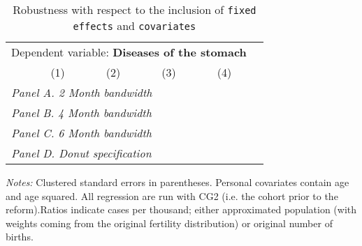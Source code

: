  \begin{table}[H] \begin{threeparttable} \centering \caption{Robustness with respect to the inclusion of \texttt{fixed effects} and \texttt{covariates}} {\def\sym#1{\ifmmode^{#1}\else\(^{#1}\)\fi} \begin{tabular}{l*{5}{c}} \toprule \multicolumn{5}{c}{Dependent variable: \textbf{Diseases of the stomach}} \\ \cmidrule(lr){2-5}
            &\multicolumn{1}{c}{(1)}&\multicolumn{1}{c}{(2)}&\multicolumn{1}{c}{(3)}&\multicolumn{1}{c}{(4)}\\
\midrule
 \multicolumn{5}{l}{\emph{Panel A. 2 Month bandwidth}} \\    \midrule\multicolumn{5}{l}{\emph{Panel B. 4 Month bandwidth}} \\    \midrule\multicolumn{5}{l}{\emph{Panel C. 6 Month bandwidth}} \\    \midrule\multicolumn{5}{l}{\emph{Panel D. Donut specification}} \\    \midrule  
\bottomrule \end{tabular} } \begin{tablenotes} \item \scriptsize \emph{Notes:} Clustered standard errors in parentheses. Personal covariates contain age and age squared. All regression are run with CG2 (i.e. the cohort prior to the reform).Ratios indicate cases per thousand; either approximated population (with weights coming from the original fertility distribution) or original number of births. \end{tablenotes} \end{threeparttable} \end{table} 
